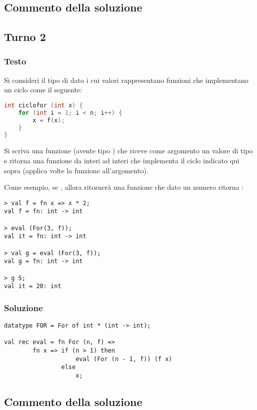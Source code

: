 \subsection{Commento della soluzione}

\omissis


\subsection{Turno 2}

\subsubsection{Testo}

Si consideri il tipo di dato  i cui valori  rappresentano funzioni che implementano un ciclo  come il seguente:

\begin{lstlisting}[language = C, frame = none]
int ciclofor (int x) {
	for (int i = 1; i < n; i++) {
		x = f(x);
	}
}
\end{lstlisting}

Si scriva una funzione  (avente tipo ) che riceve come argomento un valore di tipo  e ritorna una funzione da interi ad interi che implementa il ciclo indicato qui sopra (applica  volte la funzione  all'argomento).

\medskip
Come esempio, se , allora  ritornerà una funzione che dato un numero  ritorna :

\begin{lstlisting}[style = SML]
> val f = fn x => x * 2;
val f = fn: int -> int

> eval (For(3, f));
val it = fn: int -> int

> val g = eval (For(3, f));
val g = fn: int -> int

> g 5;
val it = 20: int
\end{lstlisting}

\subsubsection{Soluzione}

\begin{lstlisting}[style = SML, caption = {Definizione della funzione \sml{eval}}]
datatype FOR = For of int * (int -> int);

val rec eval = fn For (n, f) =>
		fn x => if (n > 1) then
					eval (For (n - 1, f)) (f x)
				else
					x;
\end{lstlisting}

\subsection{Commento della soluzione}

\omissis
